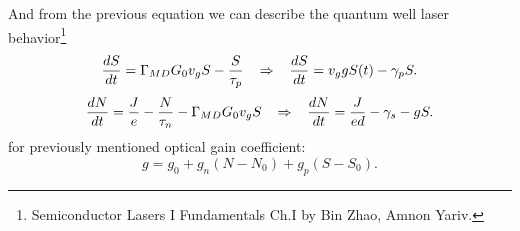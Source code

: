 And from the previous equation we can describe the quantum well laser behavior\footnote{
    Semiconductor
Lasers I
Fundamentals Ch.I by Bin Zhao, Amnon Yariv.
}
\begin{equation}
	\frac{d S}{d t} = \Gamma_{MD} G_0 v_g S - \frac{S}{\tau_p}
    \hspace{0.3 cm}
    \Rightarrow
    \hspace{0.3 cm}
    \frac{d S}{d t} = v_g g S(t) - \gamma_p S. 
\end{equation}
\begin{equation}
	\frac{d N}{d t} = \frac{J}{e} - \frac{N}{\tau_n} - \Gamma_{MD} G_0 v_g S 
    \hspace{0.3 cm}
    \Rightarrow
    \hspace{0.3 cm}
    \frac{d N}{d t}
    = \frac{J}{e d} - \gamma_s - g S.
\end{equation}
for previously mentioned optical gain coefficient:
\begin{equation}
	g = g_0 + g_n(N-N_0) + g_p(S - S_0).
\end{equation}